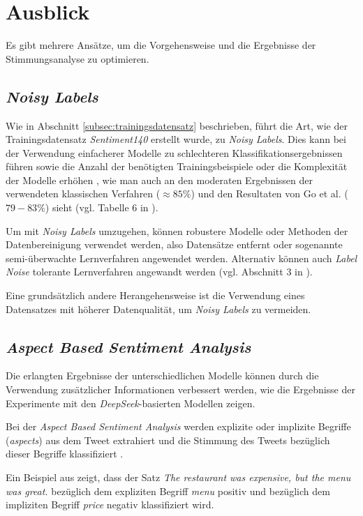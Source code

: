 \section{Ausblick}\label{sec:ausblick}

Es gibt mehrere Ansätze, um die Vorgehensweise und die Ergebnisse der Stimmungsanalyse zu optimieren.

\subsection{\textit{Noisy Labels}}
Wie in Abschnitt \ref{subsec:trainingsdatensatz} beschrieben, führt die Art, wie der Trainingsdatensatz \textit{Sentiment140} erstellt wurde, zu \textit{Noisy Labels}.
Dies kann bei der Verwendung einfacherer Modelle zu schlechteren Klassifikationsergebnissen führen sowie die Anzahl der benötigten Trainingsbeispiele oder die Komplexität der Modelle erhöhen \cite{NoisyLabel2014}, wie man auch an den moderaten Ergebnissen der verwendeten klassischen Verfahren ($\approx{85}\%$) und den Resultaten von Go et al. ($79-83\%$) sieht (vgl. Tabelle 6 in \cite{go2009twitter}).

Um mit \textit{Noisy Labels} umzugehen, können robustere Modelle oder Methoden der Datenbereinigung verwendet werden, also Datensätze entfernt oder sogenannte semi-überwachte Lernverfahren angewendet werden. Alternativ können auch \textit{Label Noise} tolerante Lernverfahren angewandt werden (vgl. Abschnitt 3 in \cite{NoisyLabel2014}).

Eine grundsätzlich andere Herangehensweise ist die Verwendung eines Datensatzes mit höherer Datenqualität, um \textit{Noisy Labels} zu vermeiden.

\subsection{\textit{Aspect Based Sentiment Analysis}}

Die erlangten Ergebnisse der unterschiedlichen Modelle können durch die Verwendung zusätzlicher Informationen verbessert werden, wie die Ergebnisse der Experimente mit den \textit{DeepSeek}-basierten Modellen zeigen.

Bei der \textit{Aspect Based Sentiment Analysis} werden explizite oder implizite Begriffe (\textit{aspects}) aus dem Tweet extrahiert und die Stimmung des Tweets bezüglich dieser Begriffe klassifiziert \cite{Hua_2024}.

Ein Beispiel aus \cite{Hua_2024} zeigt, dass der Satz \glqq \textit{The restaurant was expensive, but the menu was great.}\grqq{} bezüglich dem expliziten Begriff \textit{menu} positiv und bezüglich dem impliziten Begriff \textit{price} negativ klassifiziert wird.

